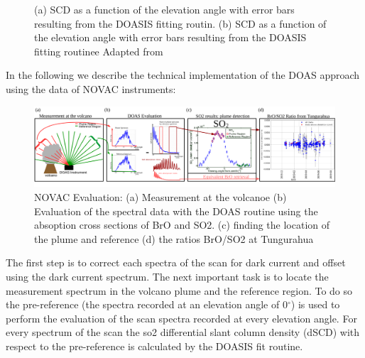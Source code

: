 \documentclass  [
  paper    = a4,
  BCOR     = 10mm,
  twoside,
  fontsize = 12pt,
  fleqn,
  toc      = bibnumbered,
  toc      = listofnumbered,
  numbers  = noendperiod,
  headings = normal,
  listof   = leveldown,
  version  = 3.03
]                                       {scrreprt}
\begin{document}
	\begin{figure}
		\caption{(a)  SCD as a function of the elevation angle with error bars resulting from the DOASIS fitting routin. (b)  SCD as a function of the elevation angle with error bars resulting from the DOASIS fitting routinee  Adapted from \cite{WarnachSimon}}
		\label{fig:plumeref}
	\end{figure}
	In the following we describe the technical implementation of the DOAS approach using the data of NOVAC instruments:\\
	\begin{figure}
		\centering
		\includegraphics[width=1\linewidth]{Bilder/NOVAC_Eval}
		\caption{NOVAC Evaluation: (a) Measurement at the volcanoe (b) Evaluation of the spectral data with the DOAS routine using the absoption cross sections of BrO and SO2. (c) finding the location of the plume and reference (d) the ratios BrO/SO2 at Tungurahua }
		\label{fig:NOVAC_Eval}
	\end{figure}
	The first step is to correct each spectra of the scan for dark current and offset using the dark current spectrum.
	The next important task is to locate the measurement spectrum in the volcano plume and the reference region. 
	To do so the pre-reference (the spectra recorded at an elevation angle of  0$^{\circ} $) is used to perform the evaluation of the scan spectra recorded at every elevation angle.
	For every spectrum of the scan the so2 differential slant column density (dSCD) with respect to the pre-reference is calculated by the DOASIS fit routine.
\end{document}
